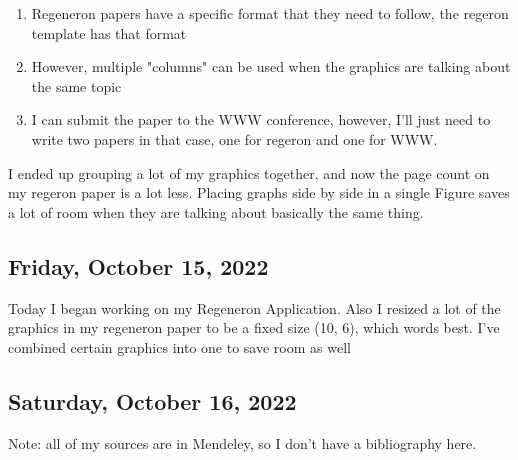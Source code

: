\documentclass[11pt,letterpaper]{article}
\begin{document}
\begin{enumerate}
    \item Regeneron papers have a specific format that they need to follow, the regeron template has that format
    \item However, multiple "columns" can be used when the graphics are talking about the same topic
    \item I can submit the paper to the WWW conference, however, I'll just need to write two papers in that case, one for regeron and one for WWW.
\end{enumerate}

I ended up grouping a lot of my graphics together, and now the page count on my regeron paper is a lot less. Placing graphs side by side in a single Figure saves a lot of room when they are talking about basically the same thing.

\subsection{Friday, October 15, 2022}
Today I began working on my Regeneron Application. Also I resized a lot of the graphics in my regeneron paper to be a fixed size (10, 6), which words best. I've combined certain graphics into one to save room as well

\subsection{Saturday, October 16, 2022}





\newpage
Note: all of my sources are in Mendeley, so I don't have a bibliography here.
\end{document}
